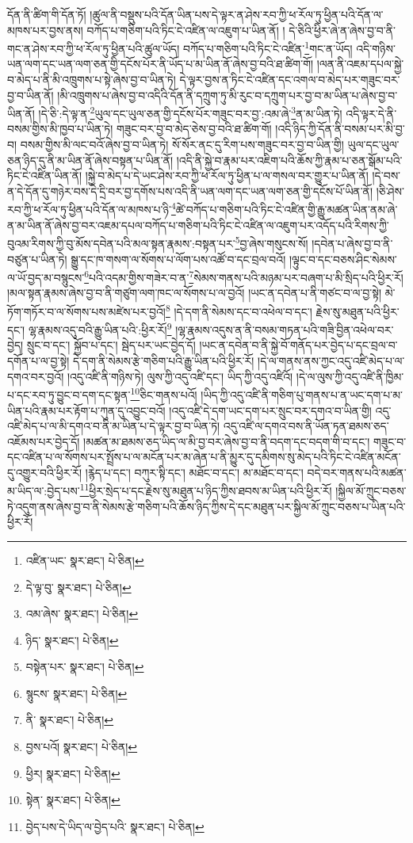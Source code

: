དོན་ནི་ཚིག་གི་དོན་ཏོ། །ཚུལ་ནི་བསྡུས་པའི་དོན་ཡིན་པས་དེ་ལྟར་ན་ཤེས་རབ་ཀྱི་ཕ་རོལ་ཏུ་ཕྱིན་པའི་དོན་ལ་མཁས་པར་བྱས་ནས། བཀོད་པ་གཅིག་པའི་ཏིང་ངེ་འཛིན་ལ་འཇུག་པ་ཡིན་ནོ། །
དེ་ཅིའི་ཕྱིར་ཞེ་ན་ཞེས་བྱ་བ་ནི་གང་ན་ཤེས་རབ་ཀྱི་ཕ་རོལ་ཏུ་ཕྱིན་པའི་ཚུལ་ཡོད། བཀོད་པ་གཅིག་པའི་ཏིང་ངེ་འཛིན་\footnote{འཛིན་ཡང་  སྣར་ཐང་།  པེ་ཅིན། }གང་ན་ཡོད། འདི་གཉིས་ཡན་ལག་དང་ཡན་ལག་ཅན་གྱི་དངོས་པོར་ནི་ཡོད་པ་མ་ཡིན་ནོ་ཞེས་བྱ་བའི་ཐ་ཚིག་གོ། །ལན་ནི་འཇམ་དཔལ་སྐྱེ་བ་མེད་པ་ནི་མི་འཁྲུགས་པ་སྟེ་ཞེས་བྱ་བ་ཡིན་ཏེ། དེ་ལྟར་བྱས་ན་ཏིང་ངེ་འཛིན་དང་འགལ་བ་མེད་པར་གཟུང་བར་བྱ་བ་ཡིན་ནོ། །མི་འཁྲུགས་པ་ཞེས་བྱ་བ་འདིའི་དོན་ནི་དཀྲུག་ཏུ་མི་རུང་བ་དཀྲུག་པར་བྱ་བ་མ་ཡིན་པ་ཞེས་བྱ་བ་ཡིན་ནོ། །དེ་ཅི་:དེ་ལྟ་ན་\footnote{དེ་ལྟ་བུ་  སྣར་ཐང་།  པེ་ཅིན། }ཡུལ་དང་ཡུལ་ཅན་གྱི་དངོས་པོར་གཟུང་བར་བྱ་:འམ་ཞེ་\footnote{འམ་ཞེས་  སྣར་ཐང་།  པེ་ཅིན། }ན་མ་ཡིན་ཏེ། འདི་ལྟར་དེ་ནི་བསམ་གྱིས་མི་ཁྱབ་པ་ཡིན་ཏེ། གཟུང་བར་བྱ་བ་མེད་ཅེས་བྱ་བའི་ཐ་ཚིག་གོ། །འདི་ཉིད་ཀྱི་དོན་ནི་བསམ་པར་མི་བྱ་བ། བསམ་གྱིས་མི་ལང་བའོ་ཞེས་བྱ་བ་ཡིན་ཏེ། སོ་སོར་ནང་དུ་རིག་པས་གཟུང་བར་བྱ་བ་ཡིན་གྱི། ཡུལ་དང་ཡུལ་ཅན་ཉིད་དུ་ནི་མ་ཡིན་ནོ་ཞེས་བསྟན་པ་ཡིན་ནོ། །འདི་ནི་སྐྱེ་བ་རྣམ་པར་འཇིག་པའི་ཆོས་ཀྱི་རྣམ་པ་ཅན་སྒོམ་པའི་ཏིང་ངེ་འཛིན་ཡིན་ནོ། །སྐྱེ་བ་མེད་པ་དེ་ཡང་ཤེས་རབ་ཀྱི་ཕ་རོལ་ཏུ་ཕྱིན་པ་ལ་གསལ་བར་གྱུར་པ་ཡིན་ནོ། །དེ་བས་ན་དེ་དོན་དུ་གཉེར་བས་དེ་དྲི་བར་བྱ་དགོས་པས་འདི་ནི་ཡན་ལག་དང་ཡན་ལག་ཅན་གྱི་དངོས་པོ་ཡིན་ནོ། །ཅི་ཤེས་རབ་ཀྱི་ཕ་རོལ་ཏུ་ཕྱིན་པའི་དོན་ལ་མཁས་པ་ཉི་\footnote{ཉིད་  སྣར་ཐང་།  པེ་ཅིན། }ཚེ་བཀོད་པ་གཅིག་པའི་ཏིང་ངེ་འཛིན་གྱི་རྒྱུ་མཚན་ཡིན་ནམ་ཞེ་ན་མ་ཡིན་ནོ་ཞེས་བྱ་བར་འཇམ་དཔལ་བཀོད་པ་གཅིག་པའི་ཏིང་ངེ་འཛིན་ལ་འཇུག་པར་འདོད་པའི་རིགས་ཀྱི་བུའམ་རིགས་ཀྱི་བུ་མོས་དབེན་པའི་མལ་སྟན་རྣམས་:བསྟན་པར་\footnote{བསྟེན་པར་  སྣར་ཐང་།  པེ་ཅིན། }བྱ་ཞེས་གསུངས་སོ། །དབེན་པ་ཞེས་བྱ་བ་ནི་བཙུན་པ་ཡིན་ཏེ། སྒྱུ་དང་ཁ་གསག་ལ་སོགས་པ་ལོག་པས་འཚོ་བ་དང་བྲལ་བའོ། །ལྟུང་བ་དང་བཅས་ཤིང་སེམས་ལ་ཡོ་བྱད་མ་བསྙུངས་\footnote{སྙུངས་  སྣར་ཐང་།  པེ་ཅིན། }པའི་འདམ་གྱིས་གཟེར་བ་ན་\footnote{ནི་  སྣར་ཐང་།  པེ་ཅིན། }སེམས་གནས་པའི་མཉམ་པར་བཞག་པ་མི་སྲིད་པའི་ཕྱིར་རོ། །མལ་སྟན་རྣམས་ཞེས་བྱ་བ་ནི་གཙུག་ལག་ཁང་ལ་སོགས་པ་ལ་བྱའོ། །ཡང་ན་དབེན་པ་ནི་གཙང་བ་ལ་བྱ་སྟེ། མེ་ཏོག་གཏོར་བ་ལ་སོགས་པས་མཛེས་པར་བྱའོ།\footnote{བྱས་པའོ།  སྣར་ཐང་།  པེ་ཅིན། } །དེ་དག་ནི་སེམས་དང་བ་འཕེལ་བ་དང་། རྗེས་སུ་མཐུན་པའི་ཕྱིར་དང་། ལྷ་རྣམས་འདུ་བའི་རྒྱུ་ཡིན་པའི་:ཕྱིར་རོ།\footnote{ཕྱིར།  སྣར་ཐང་།  པེ་ཅིན། } །ལྷ་རྣམས་འདུས་ན་ནི་བསམ་གཏན་པའི་གཟི་བྱིན་འཕེལ་བར་བྱེད། སྲུང་བ་དང་། སྐྱོབ་པ་དང་། སྦེད་པར་ཡང་བྱེད་དོ། །ཡང་ན་དབེན་བ་ནི་སྐྱེ་བོ་གནོད་པར་བྱེད་པ་དང་བྲལ་བ་དགོན་པ་ལ་བྱ་སྟེ། དེ་དག་ནི་སེམས་རྩེ་གཅིག་པའི་རྒྱུ་ཡིན་པའི་ཕྱིར་རོ། །དེ་ལ་གནས་ནས་ཀྱང་འདུ་འཛི་མེད་པ་ལ་དགའ་བར་བྱའོ། །འདུ་འཛི་ནི་གཉིས་ཏེ། ལུས་ཀྱི་འདུ་འཛི་དང་། ཡིད་ཀྱི་འདུ་འཛིའོ། །དེ་ལ་ལུས་ཀྱི་འདུ་འཛི་ནི་ཁྱིམ་པ་དང་རབ་ཏུ་བྱུང་བ་དག་དང་སྟན་\footnote{སྟེན་  སྣར་ཐང་།  པེ་ཅིན། }ཅིང་གནས་པའོ། །ཡིད་ཀྱི་འདུ་འཛི་ནི་གཅིག་པུ་གནས་པ་ན་ཡང་དག་པ་མ་ཡིན་པའི་རྣམ་པར་རྟོག་པ་ཀུན་དུ་འབྱུང་བའོ། །འདུ་འཛི་དེ་དག་ཡང་དག་པར་སྲུང་བར་དགའ་བ་ཡིན་གྱི། འདུ་འཛི་མེད་པ་ལ་མི་དགའ་བ་ནི་མ་ཡིན་པ་དེ་ལྟར་བྱ་བ་ཡིན་ཏེ། འདུ་འཛི་ལ་དགའ་བས་ནི་ཡོན་ཏན་ཐམས་ཅད་འཇོམས་པར་བྱེད་དོ། །མཚན་མ་ཐམས་ཅད་ཡིད་ལ་མི་བྱ་བར་ཞེས་བྱ་བ་ནི་བདག་དང་བདག་གི་བ་དང་། གཟུང་བ་དང་འཛིན་པ་ལ་སོགས་པར་སྤྲོས་པ་ལ་མངོན་པར་མ་ཞེན་པ་ནི་མྱུར་དུ་དམིགས་སུ་མེད་པའི་ཏིང་ངེ་འཛིན་མངོན་དུ་འགྱུར་བའི་ཕྱིར་རོ། །རྙེད་པ་དང་། བཀུར་སྟི་དང་། མཐོང་བ་དང་། མ་མཐོང་བ་དང་། བདེ་བར་གནས་པའི་མཚན་མ་ཡིད་ལ་:བྱེད་པས་\footnote{བྱེད་པས་དེ་ཡིད་ལ་བྱེད་པའི་  སྣར་ཐང་།  པེ་ཅིན། }ཕྱིར་སྲེད་པ་དང་རྗེས་སུ་མཐུན་པ་ཉིད་ཀྱིས་ཐབས་མ་ཡིན་པའི་ཕྱིར་རོ། །སྐྱིལ་མོ་ཀྲུང་བཅས་ཏེ་འདུག་ནས་ཞེས་བྱ་བ་ནི་སེམས་རྩེ་གཅིག་པའི་ཆོས་ཉིད་ཀྱིས་དེ་དང་མཐུན་པར་སྐྱིལ་མོ་ཀྲུང་བཅས་པ་ཡིན་པའི་ཕྱིར་རོ། 